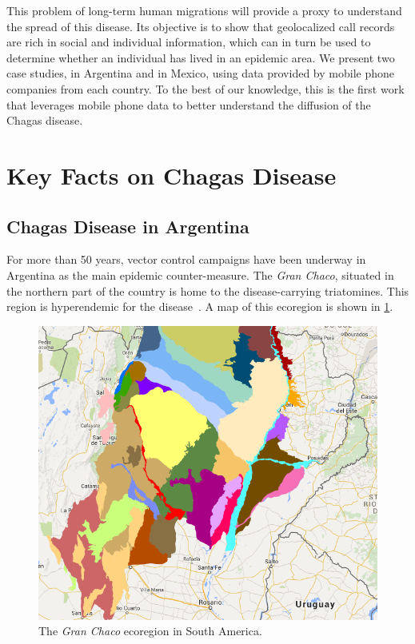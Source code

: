 This problem of long-term human migrations will provide a proxy to understand the spread of this disease. 
Its objective is to show that geolocalized call records are rich in social and individual information, which can in turn be used to determine whether an individual has lived in an epidemic area. 
We present two case studies, in Argentina and in Mexico, using data provided by mobile phone companies from each country. %
To the best of our knowledge, this is the first work that leverages mobile phone data to better understand the diffusion of the Chagas disease.


\section{Key Facts on Chagas Disease}

\subsection{Chagas Disease in  Argentina}\label{endemic_zone_argentina}

For more than 50 years, vector control campaigns have been underway in Argentina as the main epidemic counter-measure. 
The \textit{Gran Chaco}, situated in the northern part of the country is home to the disease-carrying triatomines. 
This region is hyperendemic for the disease~\cite{OPS2014mapa}. 
A map of this ecoregion is shown in \cref{fig:granchaco}.

\begin{figure}[ht]
\centering
\includegraphics[width=0.75\columnwidth]{figures/Ambientes_GranChaco_TNC-Argentina/Ambientes_GranChaco_TNC-Argentina.png}
\caption{The \textit{Gran Chaco} ecoregion in South America.%
}
\label{fig:granchaco}
\end{figure}

